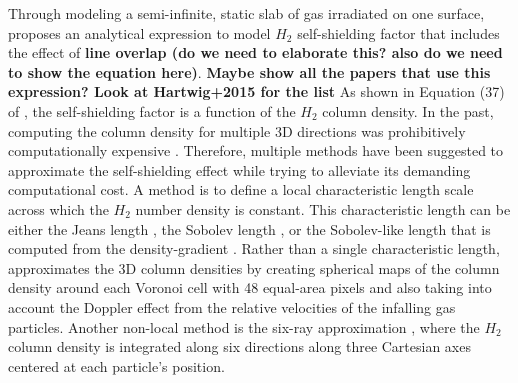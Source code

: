 \documentclass[linenumbers, twocolumn]{aastex631}
\begin{document}
Through modeling a semi-infinite, static slab of gas irradiated on one surface, \cite{Draine+1996} proposes an analytical expression to model $H_{2}$ self-shielding factor that includes the effect of \textbf{line overlap (do we need to elaborate this? also do we need to show the equation here)}. \textbf{Maybe show all the papers that use this expression? Look at Hartwig+2015 for the list} As shown in Equation (37) of \cite{Draine+1996}, the self-shielding factor is a function of the $H_{2}$ column density. In the past, computing the column density for multiple 3D directions was prohibitively computationally expensive \citep{Shang+2010, Wolcott-Green+2011}. Therefore, multiple methods have been suggested to approximate the self-shielding effect while trying to alleviate its demanding computational cost. A method is to define a local characteristic length scale across which the $H_{2}$ number density is constant. This characteristic length can be either the Jeans length \citep{Shang+2010, Johnson+2011}, the Sobolev length \citep{Sobolev+1957,Yoshida+2006}, or the Sobolev-like length that is computed from the density-gradient \citep{Gnedin+2009, Gnedin+2011}. Rather than a single characteristic length, \cite{Hartwig+2015} approximates the 3D column densities by creating spherical maps of the column density around each Voronoi cell with 48 equal-area pixels and also taking into account the Doppler effect from the relative velocities of the infalling gas particles. Another non-local method is the six-ray approximation \citep{Yoshida+2003,Yoshida+2007,Glover+2007, Glover+2007a}, where the $H_{2}$ column density is integrated along six directions along three Cartesian axes centered at each particle's position. 
\end{document}
